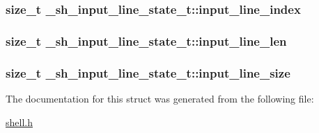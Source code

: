 \subsubsection[{\texorpdfstring{input\+\_\+line\+\_\+index}{input_line_index}}]{\setlength{\rightskip}{0pt plus 5cm}size\+\_\+t \+\_\+sh\+\_\+input\+\_\+line\+\_\+state\+\_\+t\+::input\+\_\+line\+\_\+index}\hypertarget{struct__sh__input__line__state__t_a626a3b68fc1a7ed86f564ff3163e3fed}{}\label{struct__sh__input__line__state__t_a626a3b68fc1a7ed86f564ff3163e3fed}
\subsubsection[{\texorpdfstring{input\+\_\+line\+\_\+len}{input_line_len}}]{\setlength{\rightskip}{0pt plus 5cm}size\+\_\+t \+\_\+sh\+\_\+input\+\_\+line\+\_\+state\+\_\+t\+::input\+\_\+line\+\_\+len}\hypertarget{struct__sh__input__line__state__t_a6091ac0aaaa9a7866f28b13ec406e6e2}{}\label{struct__sh__input__line__state__t_a6091ac0aaaa9a7866f28b13ec406e6e2}
\subsubsection[{\texorpdfstring{input\+\_\+line\+\_\+size}{input_line_size}}]{\setlength{\rightskip}{0pt plus 5cm}size\+\_\+t \+\_\+sh\+\_\+input\+\_\+line\+\_\+state\+\_\+t\+::input\+\_\+line\+\_\+size}\hypertarget{struct__sh__input__line__state__t_adf192ec5f0d04a9b1d49906b03ea6d5c}{}\label{struct__sh__input__line__state__t_adf192ec5f0d04a9b1d49906b03ea6d5c}


The documentation for this struct was generated from the following file\+:\begin{DoxyCompactItemize}
\item 
\hyperlink{shell_8h}{shell.\+h}\end{DoxyCompactItemize}
